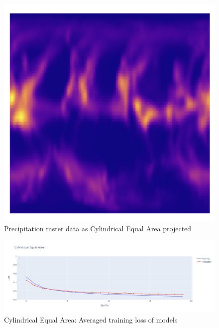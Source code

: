 \begin{figure}[H]
\begin{minipage}{0.30\textwidth}
        \includegraphics[width=0.9\linewidth]{figures/chapter-8/geopoth_cea.png}
        \caption{Precipitation raster data as Cylindrical Equal Area projected}
        \label{fig:cea_prect_raster}
    \end{minipage}\hfill
\end{figure}

\begin{figure}[H]
    \centering
    \includegraphics[width=1.0\linewidth]{figures/chapter-8/cea_loss.png}
    \caption{Cylindrical Equal Area: Averaged training loss of models  }
    \label{fig:cea_loss}
\end{figure}

